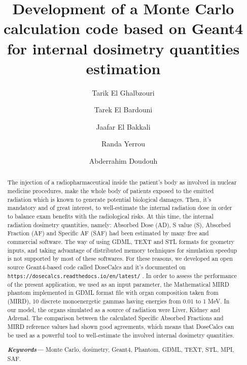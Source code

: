 \documentclass[letterpaper,12pt]{article}
\providecommand{\keywords}[1]
{
  \small	
  \textbf{\textit{\newline Keywords---}} #1
}
\begin{document}
\title{\textbf{Development of a Monte Carlo calculation code based on Geant4 for internal dosimetry quantities estimation}}

\author[1]{Tarik El Ghalbzouri}
\author[1]{Tarek El Bardouni}
\author[1,2]{Jaafar El Bakkali}
\author[1]{Randa Yerrou}
\author[3,4]{Abderrahim Doudouh}





\date{} %
\maketitle

\begin{abstract}The injection of a radiopharmaceutical inside the patient’s body as involved in nuclear medicine procedures, make the whole body of patients exposed to the emitted radiation which is known to generate potential biological damages. Then, it’s mandatory and of great interest, to well-estimate the internal radiation dose in order to balance exam benefits with the radiological risks. At this time, the internal radiation dosimetry quantities, namely: Absorbed Dose (AD), S value (S), Absorbed Fraction (AF) and Specific AF (SAF) had been estimated by many free and commercial software. The way of using GDML, TEXT and STL formats for geometry inputs, and taking advantage of distributed memory techniques for simulation speedup is not supported by most of these softwares. For these reasons, we developed an open source Geant4-based code called DoseCalcs and it's documented on \texttt{https://dosecalcs.readthedocs.io/en/latest/} . In order to assess the performance of the present application, we used as an input parameter, the Mathematical MIRD phantom implemented in GDML format file with organ composition taken from (MIRD), 10 discrete monoenergetic gammas having energies from 0.01 to 1 MeV. In our model, the organs simulated as a source of radiation were Liver, Kidney and Adrenal.
The comparison between the calculated Specific Absorbed Fractions and MIRD reference values had shown good agreements, which means that DoseCalcs can be used as a powerful tool to well-estimate the involved internal dosimetry quantities.

\keywords{Monte Carlo, dosimetry, Geant4, Phantom, GDML, TEXT, STL, MPI, SAF.}

\end{abstract}
\end{document}
